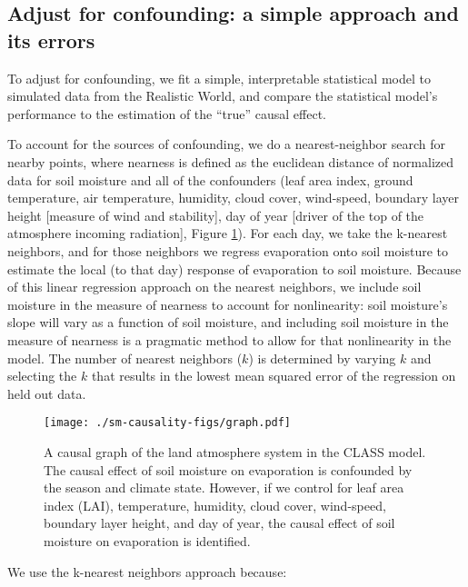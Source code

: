 \documentclass[12pt]{article}
\begin{document}
\subsection{Adjust for confounding: a simple approach and its errors}
\label{sec:attempt-meth-adjust}

To adjust for confounding, we fit a simple, interpretable statistical
model to simulated data from the Realistic World, and compare the
statistical model's performance to the estimation of the ``true''
causal effect.

To account for the sources of confounding, we do a nearest-neighbor
search for nearby points, where nearness is defined as the euclidean
distance of normalized data for soil moisture and all of the
confounders (leaf area index, ground temperature, air temperature,
humidity, cloud cover, wind-speed, boundary layer height [measure of
  wind and stability], day of year [driver of the top of the
  atmosphere incoming radiation], Figure \ref{fig:graph}).  For each
day, we take the k-nearest neighbors, and for those neighbors we
regress evaporation onto soil moisture to estimate the local (to that
day) response of evaporation to soil moisture. Because of this linear
regression approach on the nearest neighbors, we include soil moisture
in the measure of nearness to account for nonlinearity: soil
moisture's slope will vary as a function of soil moisture, and
including soil moisture in the measure of nearness is a pragmatic
method to allow for that nonlinearity in the model. The number of
nearest neighbors ($k$) is determined by varying $k$ and selecting the
$k$ that results in the lowest mean squared error of the regression on
held out data.

\begin{figure}
  \texttt{[image: ./sm-causality-figs/graph.pdf]}
  \caption{A causal graph of the land atmosphere system in the CLASS
    model. The causal effect of soil moisture on evaporation is
    confounded by the season and climate state. However, if we control
    for leaf area index (LAI), temperature, humidity, cloud cover,
    wind-speed, boundary layer height, and day of year, the causal
    effect of soil moisture on evaporation is identified. }
  \label{fig:graph}
\end{figure}

We use the k-nearest neighbors approach because:
\end{document}
